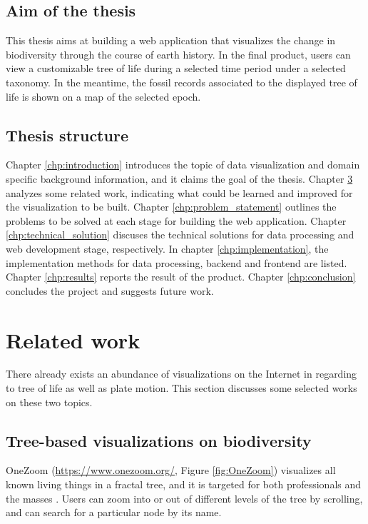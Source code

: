 \documentclass[11pt, a4paper,oneside,chapterprefix=false]{scrbook}
\begin{document}
\section{Aim of the thesis}
This thesis aims at building a web application that visualizes the change in biodiversity through the course of earth history. In the final product, users can view a customizable tree of life during a selected time period under a selected taxonomy. In the meantime, the fossil records associated to the displayed tree of life is shown on a map of the selected epoch. 

\section{Thesis structure}
Chapter \ref{chp:introduction} introduces the topic of data visualization and domain specific background information, and it claims the goal of the thesis. Chapter \ref{chp:related_work} analyzes some related work, indicating what could be learned and improved for the visualization to be built. Chapter \ref{chp:problem_statement} outlines the problems to be solved at each stage for building the web application. Chapter \ref{chp:technical_solution} discuses the technical solutions for data processing and web development stage, respectively. In chapter \ref{chp:implementation}, the implementation methods for data processing, backend and frontend are listed. Chapter \ref{chp:results} reports the result of the product. Chapter \ref{chp:conclusion} concludes the project and suggests future work.


\chapter{Related work} \label{chp:related_work}

There already exists an abundance of visualizations on the Internet in regarding to tree of life as well as plate motion. This section discusses some selected works on these two topics. 

\section{Tree-based visualizations on biodiversity}
OneZoom (\url{https://www.onezoom.org/}, Figure \ref{fig:OneZoom}) visualizes all known living things in a fractal tree, and it is targeted for both professionals and the masses \cite{rosindell2012onezoom}. Users can zoom into or out of different levels of the tree by scrolling, and can search for a particular node by its name. 
\end{document}
